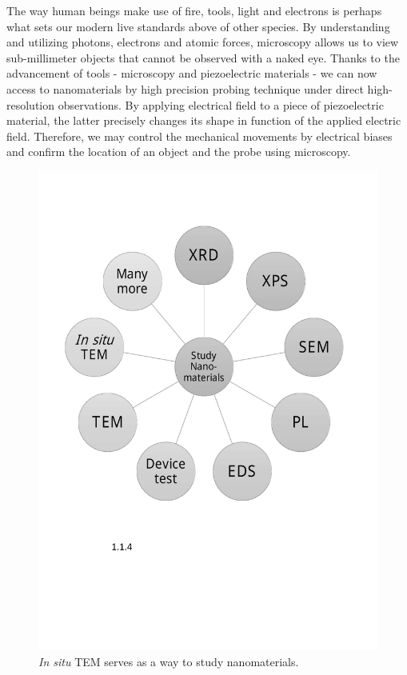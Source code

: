 The way human beings make use of fire, tools,  light and electrons is perhaps what sets our modern live standards above of other species. By understanding and utilizing photons, electrons and atomic forces, microscopy allows us to view sub-millimeter objects that cannot be observed with a naked eye. Thanks to the advancement of tools - microscopy and piezoelectric materials - we can now access to nanomaterials by high precision probing technique under direct high-resolution observations. By applying electrical field to a piece of piezoelectric material, the latter precisely changes its shape in function of the applied electric field. Therefore, we may control the mechanical movements by electrical biases and confirm the location of an object and the probe using microscopy. 

\begin{figure}  
\centering
\includegraphics[width=320pt]{figures/figure1_to_study_nanomater.pdf}
\caption[Study of nanomaterials]{{\em In situ} TEM serves as a way to study nanomaterials.
\label{fig:1tsn}}
\end{figure}


